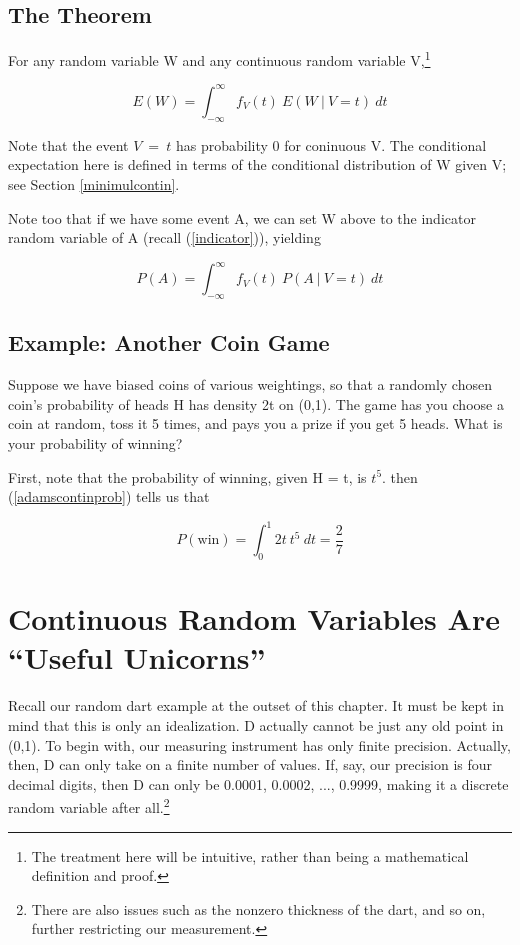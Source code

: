 \subsection{The Theorem}

For any random variable W and any continuous random variable
V,\footnote{The treatment here will be intuitive, rather than being a
mathematical definition and proof.}

\begin{equation}
\label{adamscontin}
E(W) = \int_{-\infty}^{\infty} f_V(t) ~ E(W ~|~ V = t)~ dt
\end{equation}

Note that the event $V ~=~ t$ has probability 0 for coninuous V.  The
conditional expectation here is defined in terms of the conditional
distribution of W given V; see Section \ref{minimulcontin}.

Note too that if we have some event A, we can set W above to the
indicator random variable of A (recall (\ref{indicator})), yielding

\begin{equation}
\label{adamscontinprob}
P(A) = \int_{-\infty}^{\infty} f_V(t) ~ P(A ~|~ V = t)~ dt
\end{equation}

\subsection{Example:  Another Coin Game}

Suppose we have biased coins of various weightings, so that a randomly
chosen coin's probability of heads H has density 2t on (0,1).  The game
has you choose a coin at random, toss it 5 times, and pays you a prize
if you get 5 heads.  What is your probability of winning?

First, note that the probability of winning, given H = t, is $t^5$.
then (\ref{adamscontinprob}) tells us that

\begin{equation}
P(\textrm{win}) = \int_{0}^{1} 2t ~ t^5   ~ dt = \frac{2}{7}
\end{equation}

\section{Continuous Random Variables Are ``Useful Unicorns''}
\label{unicorns}

Recall our random dart example at the outset of this chapter.  It must
be kept in mind that this is only an idealization.  D actually cannot be
just any old point in (0,1).  To begin with, our measuring instrument
has only finite precision.  Actually, then, D can only take on a finite
number of values.  If, say, our precision is four decimal digits, then D
can only be 0.0001, 0.0002, ...,  0.9999, making it a discrete random
variable after all.\footnote{There are also issues such as the nonzero
thickness of the dart, and so on, further restricting our measurement.}

